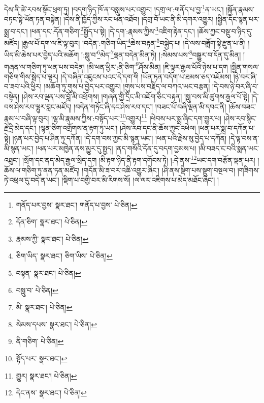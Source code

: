 དེས་ནི་ཚེ་རབས་སྟོང་ཕྲག་ཏུ། །བདག་ཉིད་ཁོ་ན་བསླུས་པར་འགྱུར། །དགྲ་ལ་:གནོད་པ་བྱ་\footnote{གནོད་པར་བྱས་  སྣར་ཐང་། གནོད་པ་བྱས་  པེ་ཅིན། }ན་ཡང་། །སྐྱོན་རྣམས་བཏང་སྟེ་ཡོན་ཏན་བསྟེན། །དེས་ནི་ཁྱོད་ཀྱིས་རང་ཕན་འཐོབ། །དགྲ་བོ་ཡང་ནི་མི་དགར་འགྱུར། །སྦྱིན་དང་སྙན་པར་སྨྲ་བ་དང་། །ཕན་དང་:དོན་གཅིག་\footnote{དོན་ཅིག་  སྣར་ཐང་།  པེ་ཅིན། }སྤྱོད་པ་སྟེ། །དེ་དག་:རྣམས་ཀྱིས་\footnote{རྣམས་ཀྱི་  སྣར་ཐང་།  པེ་ཅིན། }འཇིག་རྟེན་དང་། །ཆོས་ཀྱང་བསྡུ་བ་ཉིད་དུ་མཛོད། །རྒྱལ་པོ་དག་ལ་ཇི་ལྟ་བུར། །བདེན་:གཅིག་ཡིད་\footnote{ཅིག་ཡིད་  སྣར་ཐང་། ཅིག་ཡིས་  པེ་ཅིན། }ཆེས་བརྟན་\footnote{བསྟན་  སྣར་ཐང་།  པེ་ཅིན། }བསྐྱེད་པ། །དེ་ལས་བཟློག་སྟེ་རྫུན་པ་ནི། །ཡིད་མི་ཆེས་པར་བྱེད་པའི་མཆོག །:སླུ་བ་\footnote{བསླུ་བ་  པེ་ཅིན། }མེད་\footnote{མི་  སྣར་ཐང་།  པེ་ཅིན། }ལྡན་བདེན་མིན་ཏེ། །:སེམས་པས་\footnote{སེམས་དཔས་  སྣར་ཐང་།  པེ་ཅིན། }བསྒྱུར་བ་དོན་དུ་མིན། །གཞན་ལ་གཅིག་ཏུ་ཕན་པས་བདེན། །མི་ཕན་ཕྱིར་:ནི་ཅིག་\footnote{ནི་གཅིག་  པེ་ཅིན། }ཤོས་མིན། །ཇི་ལྟར་རྒྱལ་པོའི་ཉེས་པ་དག །སྦྱིན་གསལ་གཅིག་གིས་སྦེད་པ་ལྟར། །དེ་བཞིན་འཇུངས་པའང་དེ་དག་གི །ཡོན་ཏན་བདོག་པ་ཐམས་ཅད་འཇོམས། །ཉེ་བར་ཞི་བ་ཟབ་པའི་ཕྱིར། །མཆོག་ཏུ་གུས་པ་བྱེད་པར་འགྱུར། །གུས་པས་བརྗིད་ལ་བཀའ་ཡང་བརྩན། །དེ་བས་ཉེ་བར་ཞི་བ་བསྟེན། །ཤེས་རབ་ལྡན་པས་བློ་མི་འཕྲོགས། །གཞན་གྱི་དྲིང་མི་འཇོག་ཅིང་བརྟན། །སླུ་བས་མི་ཚུགས་རྒྱལ་པོ་སྟེ། །དེ་བས་ཤེས་རབ་ལྷུར་བླང་མཛོད། །བདེན་གཏོང་ཞི་དང་ཤེས་རབ་དང་། །བཟང་པོ་བཞི་ལྡན་མི་དབང་ནི། །ཆོས་བཟང་རྣམ་པ་བཞི་ལྟ་བུར། །ལྷ་མི་རྣམས་ཀྱིས་:བསྟོད་པར་\footnote{སྟོད་པར་  སྣར་ཐང་། }འགྱུར།\footnote{གྱུར།  སྣར་ཐང་།  པེ་ཅིན། } །ཕེབས་པར་སྨྲ་ཞིང་དག་གྱུར་པ། །ཤེས་རབ་སྙིང་རྗེ་དྲི་མེད་དང་། །ལྷན་ཅིག་འགྲོགས་ན་རྟག་ཏུ་ཡང་། །ཤེས་རབ་དང་ནི་ཆོས་ཀྱང་འཕེལ། །ཕན་པར་སྨྲ་བ་དཀོན་པ་སྟེ། །ཉན་པར་བྱེད་པ་ཤིན་ཏུ་དཀོན། །དེ་དག་བས་ཀྱང་མི་སྙན་ཡང་། །ཕན་པའི་རྗེས་སུ་བྱེད་པ་དཀོན། །དེ་ལྟ་བས་ན་མི་སྙན་ཡང་། །ཕན་པར་མཁྱེན་ནས་མྱུར་དུ་སྤྱད། །ནད་གསོའི་དོན་དུ་བདག་བྱམས་པ། །མི་བཟད་ང་བའི་སྨན་ཡང་འཐུང་། །སྲོག་དང་ནད་མེད་རྒྱལ་སྲིད་དག །མི་རྟག་ཉིད་ནི་རྟག་དགོངས་ཏེ། །:དེ་ནས་\footnote{དེང་ནས་  སྣར་ཐང་།  པེ་ཅིན། }ཡང་དག་བརྩོན་ལྡན་པར། །ཆོས་ལ་གཅིག་ཏུ་ནན་ཏན་མཛོད། །གདོན་མི་ཟ་བར་འཆི་འགྱུར་ཞིང་། །ཤི་ནས་སྡིག་པས་སྡུག་བསྔལ་བ། །གཟིགས་ཏེ་འཕྲལ་དུ་བདེ་ན་ཡང་། །སྡིག་པ་བགྱི་བར་མི་རིགས་སོ། །ལ་ལར་འཇིགས་པ་མེད་མཐོང་ཞིང་། །
